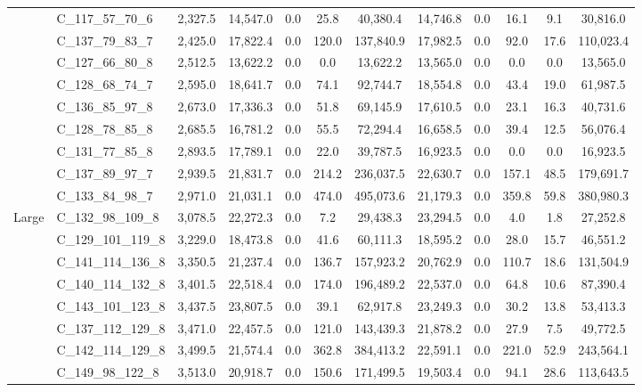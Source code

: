 \begin{table}[!ht]
{\begin{tabular}{llcccccccccc}
     & C\_117\_57\_70\_6 & 2,327.5 & 14,547.0 & 0.0 & 25.8 & 40,380.4 & 14,746.8 & 0.0 & 16.1 & 9.1 & 30,816.0 \\
     & C\_137\_79\_83\_7 & 2,425.0 & 17,822.4 & 0.0 & 120.0 & 137,840.9 & 17,982.5 & 0.0 & 92.0 & 17.6 & 110,023.4 \\
     & C\_127\_66\_80\_8 & 2,512.5 & 13,622.2 & 0.0 & 0.0 & 13,622.2 & 13,565.0 & 0.0 & 0.0 & 0.0 & 13,565.0 \\
     & C\_128\_68\_74\_7 & 2,595.0 & 18,641.7 & 0.0 & 74.1 & 92,744.7 & 18,554.8 & 0.0 & 43.4 & 19.0 & 61,987.5 \\
     & C\_136\_85\_97\_8 & 2,673.0 & 17,336.3 & 0.0 & 51.8 & 69,145.9 & 17,610.5 & 0.0 & 23.1 & 16.3 & 40,731.6 \\
     & C\_128\_78\_85\_8 & 2,685.5 & 16,781.2 & 0.0 & 55.5 & 72,294.4 & 16,658.5 & 0.0 & 39.4 & 12.5 & 56,076.4 \\
     & C\_131\_77\_85\_8 & 2,893.5 & 17,789.1 & 0.0 & 22.0 & 39,787.5 & 16,923.5 & 0.0 & 0.0 & 0.0 & 16,923.5 \\
     & C\_137\_89\_97\_7 & 2,939.5 & 21,831.7 & 0.0 & 214.2 & 236,037.5 & 22,630.7 & 0.0 & 157.1 & 48.5 & 179,691.7 \\
     & C\_133\_84\_98\_7 & 2,971.0 & 21,031.1 & 0.0 & 474.0 & 495,073.6 & 21,179.3 & 0.0 & 359.8 & 59.8 & 380,980.3 \\
     \cmidrule(l){1-12}
     \multirow[c]{14}{*}{Large} & C\_132\_98\_109\_8 & 3,078.5 & 22,272.3 & 0.0 & 7.2 & 29,438.3 & 23,294.5 & 0.0 & 4.0 & 1.8 & 27,252.8 \\
     & C\_129\_101\_119\_8 & 3,229.0 & 18,473.8 & 0.0 & 41.6 & 60,111.3 & 18,595.2 & 0.0 & 28.0 & 15.7 & 46,551.2 \\
     & C\_141\_114\_136\_8 & 3,350.5 & 21,237.4 & 0.0 & 136.7 & 157,923.2 & 20,762.9 & 0.0 & 110.7 & 18.6 & 131,504.9 \\
     & C\_140\_114\_132\_8 & 3,401.5 & 22,518.4 & 0.0 & 174.0 & 196,489.2 & 22,537.0 & 0.0 & 64.8 & 10.6 & 87,390.4 \\
     & C\_143\_101\_123\_8 & 3,437.5 & 23,807.5 & 0.0 & 39.1 & 62,917.8 & 23,249.3 & 0.0 & 30.2 & 13.8 & 53,413.3 \\
     & C\_137\_112\_129\_8 & 3,471.0 & 22,457.5 & 0.0 & 121.0 & 143,439.3 & 21,878.2 & 0.0 & 27.9 & 7.5 & 49,772.5 \\
     & C\_142\_114\_129\_8 & 3,499.5 & 21,574.4 & 0.0 & 362.8 & 384,413.2 & 22,591.1 & 0.0 & 221.0 & 52.9 & 243,564.1 \\
     & C\_149\_98\_122\_8 & 3,513.0 & 20,918.7 & 0.0 & 150.6 & 171,499.5 & 19,503.4 & 0.0 & 94.1 & 28.6 & 113,643.5 \\

\end{tabular}}
\end{table}
